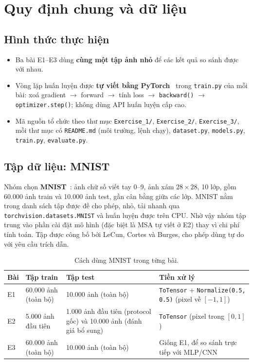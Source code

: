 \documentclass[12pt]{article}
\newcommand{\code}[1]{\texttt{#1}}
\newcommand{\st}[1]{\textbf{#1}}
\begin{document}
\section{Quy định chung và dữ liệu}
\subsection{Hình thức thực hiện}
\begin{itemize}
  \item Ba bài E1--E3 dùng \st{cùng một tập ảnh nhỏ} để các kết quả so sánh được với nhau.
  \item Vòng lặp huấn luyện được \st{tự viết bằng PyTorch}~\cite{pytorch} trong \code{train.py} của mỗi bài: xoá gradient
        $\rightarrow$ forward $\rightarrow$ tính loss $\rightarrow$ \code{backward()} $\rightarrow$ \code{optimizer.step()};
        không dùng API huấn luyện cấp cao.
  \item Mã nguồn tổ chức theo thư mục \code{Exercise\_1/}, \code{Exercise\_2/}, \code{Exercise\_3/}, mỗi thư mục có
        \code{README.md} (môi trường, lệnh chạy), \code{dataset.py}, \code{models.py}, \code{train.py}, \code{evaluate.py}.
\end{itemize}

\subsection{Tập dữ liệu: MNIST}
Nhóm chọn \st{MNIST}~\cite{lecun1998}: ảnh chữ số viết tay 0--9, ảnh xám $28\times28$, 10 lớp, gồm 60.000 ảnh train và
10.000 ảnh test, gần cân bằng giữa các lớp. MNIST nằm trong danh sách tập được đề cho phép, nhỏ, tải nhanh qua
\code{torchvision.datasets.MNIST} và huấn luyện được trên CPU. Nhờ vậy nhóm tập trung vào phần cài đặt mô hình (đặc biệt
là MSA tự viết ở E2) thay vì chi phí tính toán. Tập được công bố bởi LeCun, Cortes và Burges, cho phép dùng tự do với yêu
cầu trích dẫn.

\begin{table}[H]
\centering
\caption{Cách dùng MNIST trong từng bài.}\label{tab:data}
\begin{tabularx}{\linewidth}{@{}P{1.4cm}P{3.6cm}P{3.6cm}L@{}}
\toprule
Bài & Tập train & Tập test & Tiền xử lý \\\midrule
E1 & 60.000 ảnh (toàn bộ) & 10.000 ảnh (toàn bộ) & \code{ToTensor} + \code{Normalize(0.5, 0.5)} (pixel về $[-1, 1]$) \\
E2 & 5.000 ảnh đầu tiên & 1.000 ảnh đầu tiên (protocol gốc) và 10.000 ảnh (đánh giá bổ sung) & \code{ToTensor} (pixel trong $[0, 1]$) \\
E3 & 60.000 ảnh (toàn bộ) & 10.000 ảnh (toàn bộ) & Giống E1, để so sánh trực tiếp với MLP/CNN \\
\bottomrule
\end{tabularx}
\end{table}
\end{document}
